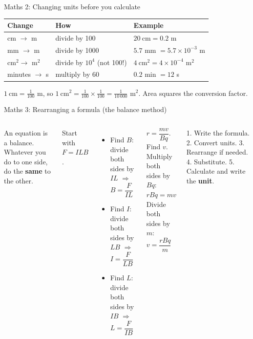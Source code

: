 \documentclass[aspectratio=169,11pt,xcolor=table]{beamer}
\begin{document}
\begin{frame}{Maths 2: Changing units before you calculate}
\centering\renewcommand{\arraystretch}{1.25}
\begin{tabular}{@{}lll@{}}
\toprule
\textbf{Change} & \textbf{How} & \textbf{Example}\\
\midrule
cm $\to$ m & divide by 100 & $20\ \text{cm}=0.2$ m\\
mm $\to$ m & divide by 1000 & $5.7$ mm $=5.7\times10^{-3}$ m\\
cm$^2\to$ m$^2$ & divide by $10^{4}$ (not 100!) & $4\ \text{cm}^2=4\times10^{-4}$ m$^2$\\
minutes $\to$ s & multiply by 60 & $0.2$ min $=12$ s\\
\bottomrule
\end{tabular}
\vspace{6pt}
\begin{simple}
$1\ \text{cm}=\frac{1}{100}$ m, so $1\ \text{cm}^2=\frac{1}{100}\times\frac{1}{100}=\frac{1}{10\,000}$ m$^2$. Area squares the conversion factor.
\end{simple}
\end{frame}
\begin{frame}{Maths 3: Rearranging a formula (the balance method)}
\begin{columns}[T]
\begin{simple}
An equation is a balance. Whatever you do to one side, do the \textbf{same} to the other.
\end{simple}
Start with $F=ILB$.
\begin{itemize}
\item Find $B$: divide both sides by $IL$ $\Rightarrow$ $B=\dfrac{F}{IL}$
\item Find $I$: divide both sides by $LB$ $\Rightarrow$ $I=\dfrac{F}{LB}$
\item Find $L$: divide both sides by $IB$ $\Rightarrow$ $L=\dfrac{F}{IB}$
\end{itemize}
\begin{answer}
$r=\dfrac{mv}{Bq}$. Find $v$.\\[3pt]
Multiply both sides by $Bq$: $rBq=mv$\\
Divide both sides by $m$: $v=\dfrac{rBq}{m}$
\end{answer}
\begin{examtip}
1. Write the formula. 2. Convert units. 3. Rearrange if needed. 4. Substitute. 5. Calculate and write the \textbf{unit}.
\end{examtip}
\end{columns}
\end{frame}
\end{document}
